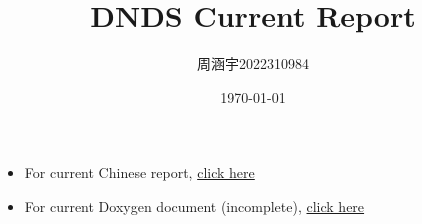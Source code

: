 \documentclass[UTF8,zihao=5]{ctexart} %
\title{{\bfseries\rmfamily\Huge{DNDS Current Report}}}
\author{周涵宇\hspace{2em}2022310984}
\date{\today}
\begin{document}
\maketitle
\thispagestyle{empty}

\begin{itemize}
    \item For current Chinese report, \href{docs/report_2023-06/DNDSR_report.pdf}{click here}
    \item For current Doxygen document (incomplete), \href{build/docs/html/index.html}{click here}
\end{itemize}
\end{document}
